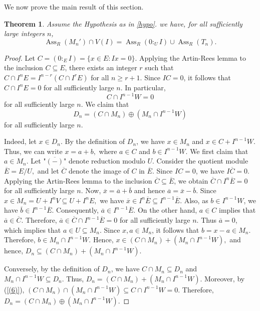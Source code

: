 \documentclass[11pt,reqno]{amsart}
\newtheorem{theorem}{Theorem}[section]
\theoremstyle{definition}
\newcommand{\Ass}{\operatorname{Ass}}
\begin{document}
We now prove the main result of this section.
\begin{theorem}\label{ass prime th Mn' and Tn}
    Assume the Hypothesis as in \ref{hypo}. we have, for all sufficiently large integers $n$,
\[
\Ass_R(M_n')\cap V(I)
=
\Ass_R(0:_UI)\cup\Ass_R(T_n).
\]
\end{theorem}

\begin{proof}
    Let $C=(0:_E I)=\{x\in E:Ix=0\}.$  Applying the Artin-Rees lemma  to the inclusion $C\subseteq E$, there exists an integer $r$ such that $C\cap I^nE = I^{n-r}(C\cap I^rE)$ for all $n\geq r+1$.
Since $IC=0$, it follows that
$C\cap I^nE=0$
for all sufficiently large $n$.
In particular,
\begin{equation}\label{(6)}
C\cap I^{n-1}W=0
\end{equation}
for all sufficiently large $n$. We claim that
\begin{equation}\label{(7)}
D_n=(C\cap M_n)\oplus
(M_n\cap I^{n-1}W)
\end{equation}
for all sufficiently large $n$.

Indeed, let $x\in D_n$. By the definition of
$D_n$, we have $x\in M_n$ and $x\in C+I^{n-1}W.$
Thus, we can write $x=a+b,$ where $a\in C$ and $b\in I^{n-1}W$.
We first claim that $a\in M_n$. Let "$\overline{(-)}$" denote reduction modulo $U$. Consider the quotient module $\overline{E}=E/U,$ and let $\overline{C}$ denote the image of $C$ in $\overline{E}$. Since $IC=0$, we have $I\overline{C}=0.$ Applying the Artin-Rees lemma   to the inclusion $\overline{C}\subseteq\overline{E}$, we obtain
$\overline{C}\cap I^n\overline{E}=0$ for all sufficiently large $n$.
Now,
$\overline{x}=\overline{a}+\overline{b}$ and hence
$\overline{a}=\overline{x}-\overline{b}.$ Since
$x\in M_n=U+I^nV\subseteq U+I^nE,$
we have $\overline{x}\in I^n\overline{E} \subseteq I^{n-1}\overline{E}.$ Also, as $b\in I^{n-1}W$, we have
$\overline{b}\in I^{n-1}\overline{E}.$
Consequently, $\overline{a}\in I^{n-1}\overline{E}.$
On the other hand, $a\in C$ implies that $\overline{a}\in\overline{C}$. Therefore, $\overline{a}\in
\overline{C}\cap I^{n-1}\overline{E}=0$ for all sufficiently large $n$. Thus $\overline{a}=0$, which implies that
$a\in U\subseteq M_n.$
Since $x,a\in M_n$, it follows that
$b=x-a\in M_n.$ Therefore,
$b\in M_n\cap I^{n-1}W.$ Hence,
$x\in (C\cap M_n)+(M_n\cap I^{n-1}W),$ and hence,
$D_n\subseteq (C\cap M_n)+(M_n\cap I^{n-1}W).$

Conversely, by the definition of $D_n$, we have
$C\cap M_n\subseteq D_n$ and $M_n\cap I^{n-1}W\subseteq D_n.$
Thus, $D_n=(C\cap M_n)+(M_n\cap I^{n-1}W).$
Moreover, by (\ref{(6)}), $(C\cap M_n)\cap(M_n\cap I^{n-1}W) \subseteq C\cap I^{n-1}W=0.$ Therefore, $D_n=(C\cap M_n)\oplus (M_n\cap I^{n-1}W).$


\end{proof}
\end{document}
